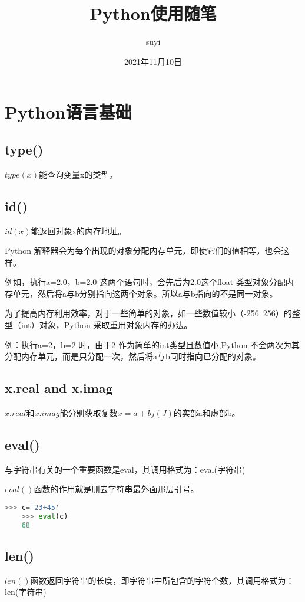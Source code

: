 \documentclass[11pt,a4paper]{article}
\title{Python使用随笔}
\author{suyi}
\date{2021年11月10日}
\begin{document}
\maketitle
\thispagestyle{empty}       %
\newpage
\tableofcontents
\thispagestyle{empty}       %
\newpage
\setcounter{page}{1}        %
\section{Python语言基础}

\subsection{type()}
$type(x)$能查询变量x的类型。

\subsection{id()}
$id(x)$能返回对象x的内存地址。

Python 解释器会为每个出现的对象分配内存单元，即使它们的值相等，也会这样。

例如，执行a=2.0，b=2.0 这两个语句时，会先后为2.0这个float 类型对象分配内存单元，然后将a与b分别指向这两个对象。所以a与b指向的不是同一对象。

为了提高内存利用效率，对于一些简单的对象，如一些数值较小（-256~256）的整型（int）对象，Python 采取重用对象内存的办法。

例：执行a=2，b=2 时，由于2 作为简单的int类型且数值小,Python 不会两次为其分配内存单元，而是只分配一次，然后将a与b同时指向已分配的对象。

\subsection{x.real and x.imag}
$x.real$和$x.imag$能分别获取复数$x=a+bj(J)$的实部a和虚部b。
\subsection{eval()}
与字符串有关的一个重要函数是eval，其调用格式为：eval(字符串)

$eval()$函数的作用就是删去字符串最外面那层引号。

\begin{lstlisting}[language={Python}]
    >>> c='23+45'
    >>> eval(c)
    68
\end{lstlisting}

\subsection{len()}
$len()$函数返回字符串的长度，即字符串中所包含的字符个数，其调用格式为：len(字符串)
\end{document}

